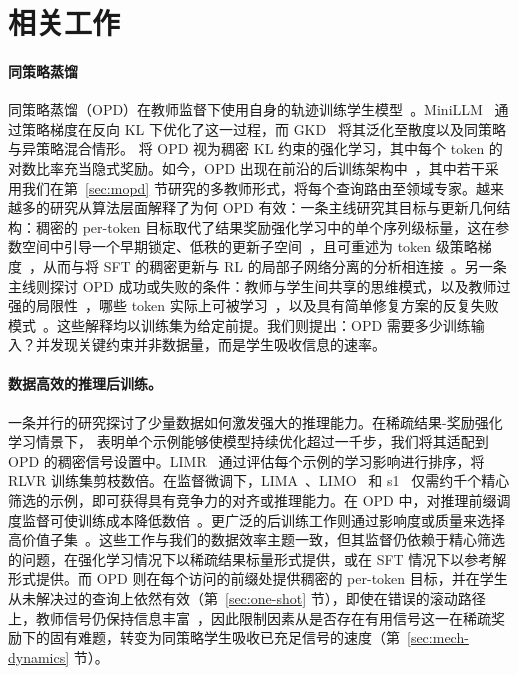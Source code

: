
\section{相关工作}
\label{sec:related}

\paragraph{同策略蒸馏}
同策略蒸馏（OPD）在教师监督下使用自身的轨迹训练学生模型~\citep{song2026survey}。MiniLLM~\citep{gu2024minillm} 通过策略梯度在反向 KL 下优化了这一过程，而 GKD~\citep{agarwal2024policy} 将其泛化至散度以及同策略与异策略混合情形。\citet{yang2026learning} 将 OPD 视为稠密 KL 约束的强化学习，其中每个 token 的对数比率充当隐式奖励。如今，OPD 出现在前沿的后训练架构中~\citep{yang2025qwen3,zeng2026glm,xiao2026mimo,xu2026deepseek,blakeman2026nemotron}，其中若干采用我们在第~\ref{sec:mopd} 节研究的多教师形式，将每个查询路由至领域专家。越来越多的研究从算法层面解释了为何 OPD 有效：一条主线研究其目标与更新几何结构：稠密的 per-token 目标取代了结果奖励强化学习中的单个序列级标量，这在参数空间中引导一个早期锁定、低秩的更新子空间~\citep{cai2026learning,shen2026geometry}，且可重述为 token 级策略梯度~\citep{ko2026scaling}，从而与将 SFT 的稠密更新与 RL 的局部子网络分离的分析相连接~\citep{mukherjee2026reinforcement,zhu2025path}。另一条主线则探讨 OPD 成功或失败的条件：教师与学生间共享的思维模式，以及教师过强的局限性~\citep{li2026rethinking}，哪些 token 实际上可被学习~\citep{armandpour2026unmasking,wang2026not}，以及具有简单修复方案的反复失败模式~\citep{zhu2026many,fu2026revisiting}。这些解释均以训练集为给定前提。我们则提出：OPD 需要多少训练输入？并发现关键约束并非数据量，而是学生吸收信息的速率。

\paragraph{数据高效的推理后训练。}
一条并行的研究探讨了少量数据如何激发强大的推理能力。在稀疏结果-奖励强化学习情景下，\citet{wang2025oneshot} 表明单个示例能够使模型持续优化超过一千步，我们将其适配到 OPD 的稠密信号设置中。LIMR~\citep{limr} 通过评估每个示例的学习影响进行排序，将 RLVR 训练集剪枝数倍。在监督微调下，LIMA~\citep{zhou2023lima}、LIMO~\citep{ye2025limo} 和 s1~\citep{muennighoff2025s1} 仅需约千个精心筛选的示例，即可获得具有竞争力的对齐或推理能力。在 OPD 中，对推理前缀调度监督可使训练成本降低数倍~\citep{zhang2026fast}。更广泛的后训练工作则通过影响度或质量来选择高价值子集~\citep{xia2024less,chen2024alpagasus,he2025right,he2025air}。这些工作与我们的数据效率主题一致，但其监督仍依赖于精心筛选的问题，在强化学习情况下以稀疏结果标量形式提供，或在 SFT 情况下以参考解形式提供。而 OPD 则在每个访问的前缀处提供稠密的 per-token 目标，并在学生从未解决过的查询上依然有效（第~\ref{sec:one-shot} 节），即使在错误的滚动路径上，教师信号仍保持信息丰富~\citep{armandpour2026unmasking}，因此限制因素从是否存在有用信号这一在稀疏奖励下的固有难题，转变为同策略学生吸收已充足信号的速度（第~\ref{sec:mech-dynamics} 节）。

